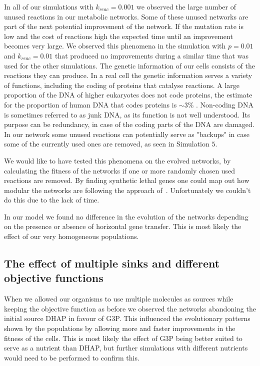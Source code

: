 \documentclass[a4paper,12pt]{article}
\begin{document}
In all of our simulations with $k_{reac}=0.001$ we observed the large number of unused reactions in our metabolic networks. Some of these unused networks are part of the next potential improvement of the network. If the mutation rate is low and the cost of reactions high the expected time until an improvement becomes very large. We observed this phenomena in the simulation with $p=0.01$ and $k_{reac}=0.01$ that produced no improvements during a similar time that was used for the other simulations. The genetic information of our cells consists of the reactions they can produce. In a real cell the genetic information serves a variety of functions, including the coding of proteins that catalyse reactions. A large proportion of the DNA of higher eukaryotes does not code proteins, the estimate for the proportion of human DNA that codes proteins is $\sim 3\%$ \cite{junkdna}. Non-coding DNA is sometimes referred to as junk DNA, as its function is not well understood. Its purpose can be redundancy, in case of the coding parts of the DNA are damaged. In our network some unused reactions can potentially serve as "backups" in case some of the currently used ones are removed, as seen in Simulation $5$. 

We would like to have tested this phenomena on the evolved networks, by calculating the fitness of the networks if one or more randomly chosen used reactions are removed. By finding synthetic lethal genes one could map out how modular the networks are following the approach of~\cite{evolutioncomplex}. Unfortunately we couldn't do this due to the lack of time.

In our model we found no difference in the evolution of the networks depending on the presence or absence of horizontal gene transfer. This is most likely the effect of our very homogeneous populations. 

\subsection{The effect of multiple sinks and different objective functions}
\label{sub:the_effect_of_multiple_sinks}

When we allowed our organisms to use multiple molecules as sources while keeping the objective function as before we observed the networks abandoning the initial source DHAP in favour of G3P. This influenced the evolutionary patterns shown by the populations by allowing more and faster improvements in the fitness of the cells. This is most likely the effect of G3P being better suited to serve as a nutrient than DHAP, but further simulations with different nutrients would need to be performed to confirm this.
\end{document}
